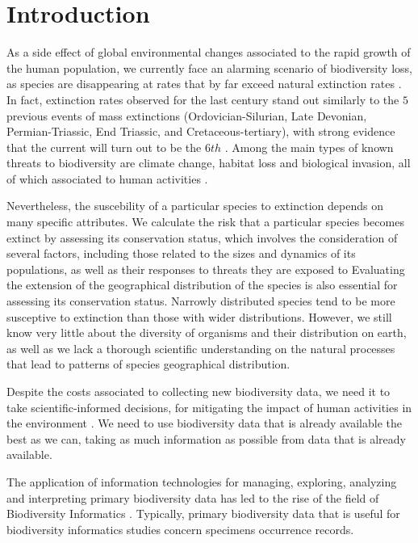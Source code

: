 \chapter{Introduction}\label{introduction}

As a side effect of global environmental changes associated to the rapid growth of the human population, we currently face an alarming scenario of biodiversity loss, as species are disappearing at rates that by far exceed natural extinction rates \cite{Ceballos2015}.
In fact, extinction rates observed for the last century stand out similarly to the $5$ previous events of mass extinctions (Ordovician-Silurian, Late Devonian, Permian-Triassic, End Triassic, and Cretaceous-tertiary), with strong evidence that the current will turn out to be the $6th$ \cite{Wake2008}.
Among the main types of known threats to biodiversity are climate change, habitat loss and biological invasion, all of which associated to human activities \cite{Wilcove1998}.

Nevertheless, the suscebility of a particular species to extinction depends on many specific attributes.
We calculate the risk that a particular species becomes extinct by assessing its conservation status, which involves the consideration of several factors, including those related to the sizes and dynamics of its populations, as well as their responses to threats they are exposed to
Evaluating the extension of the geographical distribution of the species is also essential for assessing its conservation status. %
Narrowly distributed species tend to be more susceptive to extinction than those with wider distributions.
However, we still know very little about the diversity of organisms and their distribution on earth, as well as we lack a thorough scientific understanding on the natural processes that lead to patterns of species geographical distribution.

Despite the costs associated to collecting new biodiversity data, we need it to take scientific-informed decisions, for mitigating the impact of human activities in the environment \cite{Dozzier_4paradigm_2009, Funk1999}.
We need to use biodiversity data that is already available the best as we can, taking as much information as possible from data that is already available.

The application of information technologies for managing, exploring, analyzing and interpreting primary biodiversity data has led to the rise of the field of Biodiversity Informatics \cite{Soberon2004}.
Typically, primary biodiversity data that is useful for biodiversity informatics studies concern specimens occurrence records.


